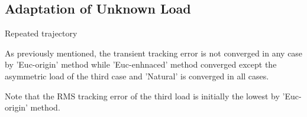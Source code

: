\documentclass[letterpaper, 10 pt, conference]{ieeeconf}  %
\begin{document}
\subsection{Adaptation of Unknown Load} \label{section:EFonly}
Repeated trajectory

As previously mentioned, the transient tracking error is not converged in any case by 'Euc-origin' method while 'Euc-enhnaced' method converged except the asymmetric load of the third case and 'Natural' is converged in all cases. 

Note that the RMS tracking error of the third load is initially the lowest by 'Euc-origin' method.






\end{document}
